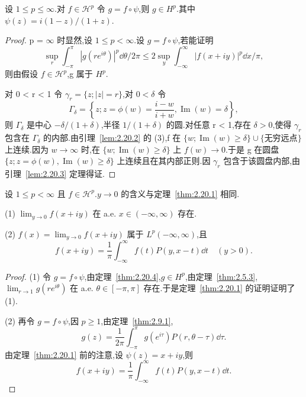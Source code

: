 \begin{theorem}\label{thm:2.20.4}
设 $1 \leq p \leq \infty$.对 $f \in \mathcal{H}^{p}$ 令 $g = f \circ \psi$,则 $g \in H^{p}$.其中 $\psi(z) = i(1 - z)/(1 + z)$.
\end{theorem}

\begin{proof}
p = $\infty$ 时显然,设 $1 \leq p < \infty$.设 $g = f \circ \psi$,若能证明
\begin{equation*}
\sup_{r}\int_{-\pi}^{\pi}|g(re^{i\theta})|^{p}\dd \theta/2\pi \leq 2\sup_{y}\int_{-\infty}^{\infty}|f(x + iy)|^{p}\dd x/\pi,
\end{equation*}
则由假设 $f \in \mathcal{H}^{p}$,g 属于 $H^{p}$.

对 0 < r < 1 令 $\gamma_{r} = \{z; |z| = r\}$,对 $0 < \delta$ 令
\begin{equation*}
\Gamma_{\delta} = \left\{z; z = \phi(w) = \frac{i - w}{i + w}, \operatorname{Im}(w) = \delta \right\},
\end{equation*}
则 $\Gamma_{\delta}$ 是中心 $-\delta/(1+\delta)$,半径 $1/(1+\delta)$ 的圆.对任意 r < 1,存在 $\delta > 0$,使得 $\gamma_{r}$ 包含在 $\Gamma_{\delta}$ 的内部.由引理~\ref{lem:2.20.2} 的 (3),f 在 $\{w; \operatorname{Im}(w) \geq \delta\} \cup \{\text{无穷远点}\}$ 上连续.因为 $w \to \infty$ 时,在 $\{w; \operatorname{Im}(w) \geq \delta\}$ 上 $f(w) \to 0$.于是 g 在圆盘 $\{z; z = \phi(w), \operatorname{Im}(w) \geq \delta\}$ 上连续且在其内部正则.因 $\gamma_{r}$ 包含于该圆盘内部,由引理~\ref{lem:2.20.3} 定理得证.
\end{proof}

\begin{theorem}\label{thm:2.20.5}
设 $1 \leq p < \infty$ 且 $f \in \mathcal{H}^{p}$.$y \to 0$ 的含义与定理~\ref{thm:2.20.1} 相同.

(1) $\lim_{y \to 0}f(x + iy)$ 在 a.e. $x \in (-\infty, \infty)$ 存在.

(2) $f(x) = \lim_{y \to 0}f(x + iy)$ 属于 $L^{p}(-\infty, \infty)$,且
\begin{equation*}
f(x + iy) = \frac{1}{\pi}\int_{-\infty}^{\infty} f(t)P(y, x - t)\dd t \quad (y > 0).
\end{equation*}
\end{theorem}

\begin{proof}
(1) 令 $g = f \circ \psi$,由定理~\ref{thm:2.20.4},$g \in H^{p}$,由定理~\ref{thm:2.5.3},$\lim_{r \to 1}g(re^{i\theta})$ 在 a.e. $\theta \in [-\pi, \pi]$ 存在.于是定理~\ref{thm:2.20.1} 的证明证明了 (1).

(2) 再令 $g = f \circ \psi$,因 $p \geq 1$,由定理~\ref{thm:2.9.1},
\begin{equation*}
g(z) = \frac{1}{2\pi}\int_{-\pi}^{\pi} g(e^{i\tau})P(r, \theta - \tau)\dd \tau .
\end{equation*}
由定理~\ref{thm:2.20.1} 前的注意,设 $\psi(z) = x + iy$,则
\begin{equation*}
f(x + iy) = \frac{1}{\pi}\int_{-\infty}^{\infty} f(t)P(y, x - t)\dd t.
\end{equation*}
\end{proof}

